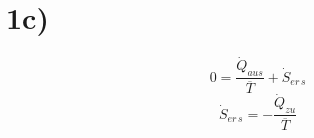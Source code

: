 

\section*{1c)}
\begin{equation*}
0 = \frac{\dot{Q}_{aus}}{\overline{T}} + \dot{S}_{er \, s}
\end{equation*}
\begin{equation*}
\dot{S}_{er \, s} = - \frac{\dot{Q}_{zu}}{\overline{T}}
\end{equation*}